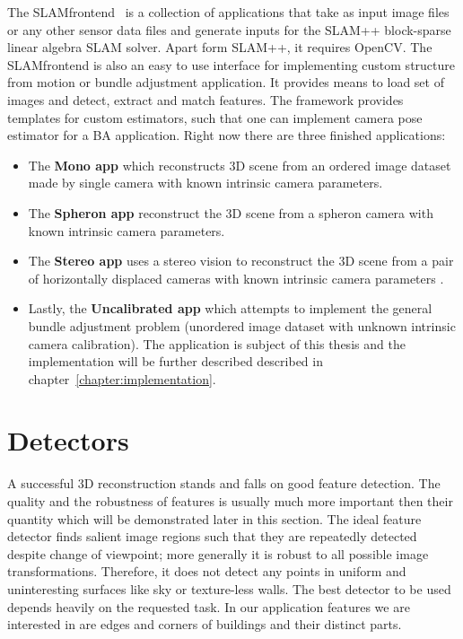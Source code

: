 The SLAM\textunderscore frontend~\cite{www:slam_frontend} is a collection of applications that take as input image files or any other sensor data files and generate inputs for the SLAM++ block-sparse linear algebra SLAM solver. Apart form SLAM++, it requires OpenCV. The SLAM\textunderscore frontend is also an easy to use interface for implementing custom structure from motion or bundle adjustment application. It provides means to load set of images and detect, extract and match features. The framework provides templates for custom estimators, such that one can implement camera pose estimator for a BA application. Right now there are three finished applications:

\begin{itemize}
	\item The \textbf{Mono app} which reconstructs 3D scene from an ordered image dataset made by single camera with known intrinsic camera parameters.
	
	\item The \textbf{Spheron app} reconstruct the 3D scene from a spheron camera with known intrinsic camera parameters.
	
	\item The \textbf{Stereo app} uses a stereo vision to reconstruct the 3D scene from a pair of horizontally displaced cameras with known intrinsic camera parameters .
	
	\item Lastly, the \textbf{Uncalibrated app} which attempts to implement the general bundle adjustment problem (unordered image dataset with unknown intrinsic camera calibration). The application is subject of this thesis and the implementation will be further described described in chapter~\ref{chapter:implementation}.
\end{itemize}

\section{Detectors}
\label{sec:detectors}
A successful 3D reconstruction stands and falls on good feature detection. The quality and the robustness of features is usually much more important then their quantity which will be demonstrated later in this section. The ideal feature detector finds salient image regions such that they are repeatedly detected despite change of viewpoint; more generally it is robust to all possible image transformations. Therefore, it does not detect any points in uniform and uninteresting surfaces like sky or texture-less walls. The best detector to be used depends heavily on the requested task. In our application features we are interested in are edges and corners of buildings and their distinct parts.

